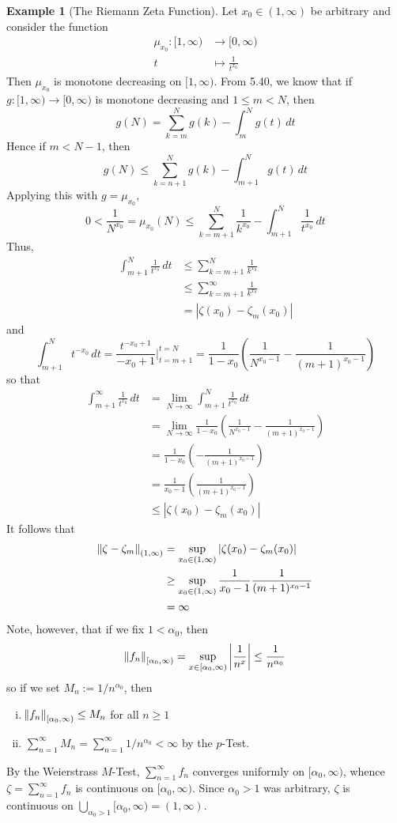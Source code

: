 \documentclass[11pt]{article}
\theoremstyle{definition}
\newtheorem{exmp}[thm]{Example}
\begin{document}
\begin{exmp}[The Riemann Zeta Function]
Let $x_0 \in (1, \infty)$ be arbitrary and consider the function
\begin{align*}
\mu_{x_0} : [1, \infty) & \to [0, \infty) \\
t & \mapsto \frac{1}{t^{x_0}}
\end{align*}
Then $\mu_{x_0}$ is monotone decreasing on $[1, \infty)$. From 5.40, we know that if $g : [1, \infty) \to [0, \infty)$ is monotone decreasing and $1 \leq m < N$, then
$$g(N) = \sum_{k=m}^N g(k) - \int_m^N g(t)\,dt$$
Hence if $m < N - 1$, then
$$g(N) \leq \sum_{k=n+1}^N g(k) - \int_{m+1}^N g(t)\,dt$$
Applying this with $g = \mu_{x_0}$,
$$0 < \frac{1}{N^{x_0}} = \mu_{x_0}(N) \leq \sum_{k=m+1}^N \frac{1}{k^{x_0}} - \int_{m+1}^N \frac{1}{t^{x_0}}\,dt$$
Thus,
\begin{align*}
\int_{m+1}^N \frac{1}{t^{x_0}}\,dt & \leq \sum_{k=m+1}^N \frac{1}{k^{x_0}} \\
& \leq \sum_{k=m+1}^\infty \frac{1}{k^{x_0}} \\
& = \left| \zeta(x_0) - \zeta_m(x_0) \right|
\end{align*}
and
$$\int_{m+1}^N t^{-x_0}\,dt = \frac{t^{-x_0+1}}{-x_0 + 1} \biggr|_{t=m+1}^{t=N} = \frac{1}{1-x_0} \left( \frac{1}{N^{x_0-1}} - \frac{1}{(m+1)^{x_0-1}} \right)$$
so that
\begin{align*}
\int_{m+1}^\infty \frac{1}{t^{x_0}}\,dt 
& = \lim_{N\to\infty} \int_{m+1}^N \frac{1}{t^{x_0}}\,dt \\
& = \lim_{N\to\infty} \frac{1}{1-x_0} \left( \frac{1}{N^{x_0-1}} - \frac{1}{(m+1)^{x_0-1}}\right) \\
& = \frac{1}{1-x_0} \left( - \frac{1}{(m+1)^{x_0-1}} \right) \\
& = \frac{1}{x_0 - 1} \left( \frac{1}{(m+1)^{x_0 - 1}} \right) \\
& \leq |\zeta(x_0) - \zeta_m(x_0)|
\end{align*}
It follows that
\begin{align*}
\norm{\zeta - \zeta_m}_{(1, \infty)} 
& = \sup_{x_0 \in (1, \infty)} |\zeta(x_0) - \zeta_m(x_0)| \\
& \geq \sup_{x_0 \in (1, \infty)} \frac{1}{x_0 - 1} \frac{1}{(m+1)^{x_0 - 1}} \\
& = \infty
\end{align*}
Note, however, that if we fix $1 < \alpha_0$, then
$$\norm{f_n}_{[\alpha_0, \infty)} = \sup_{x \in [\alpha_0, \infty)} \left| \frac{1}{n^x} \right| \leq \frac{1}{n^{\alpha_0}}$$
so if we set $M_n := 1/n^{\alpha_0}$, then
\begin{enumerate}[(i)] \vspace{-0.2cm}
\item $\norm{f_n}_{[\alpha_0, \infty)} \leq M_n$ for all $n \geq 1$
\item $\sum_{n=1}^\infty M_n = \sum_{n=1}^\infty 1/n^{\alpha_0} < \infty$ by the $p$-Test.
\end{enumerate}
By the Weierstrass $M$-Test, $\sum_{n=1}^\infty f_n$ converges uniformly on $[\alpha_0, \infty)$, whence $\zeta = \sum_{n=1}^\infty f_n$ is continuous on $[\alpha_0, \infty)$. Since $\alpha_0 > 1$ was arbitrary, $\zeta$ is continuous on $\bigcup_{\alpha_0 > 1} [\alpha_0, \infty) = (1, \infty)$.
\end{exmp}
\end{document}
